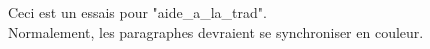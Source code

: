 Ceci est un essais pour "aide_a_la_trad".\\
Normalement, les paragraphes devraient se synchroniser en couleur.\\
